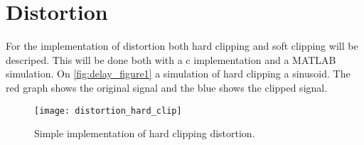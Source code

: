 \section{Distortion}
For the implementation of distortion both hard clipping and soft clipping will be descriped. This will be done both with a c implementation and a MATLAB simulation.
On \autoref{fig:delay_figure1} a simulation of hard clipping a sinusoid. The red graph shows the original signal and the blue shows the clipped signal. 
\begin{figure}[htb]
    \centering
    \texttt{[image: distortion\_hard\_clip]}
    \caption{Simple implementation of hard clipping distortion.}{
    \label{fig:delay_figure1}
    }
\end{figure}